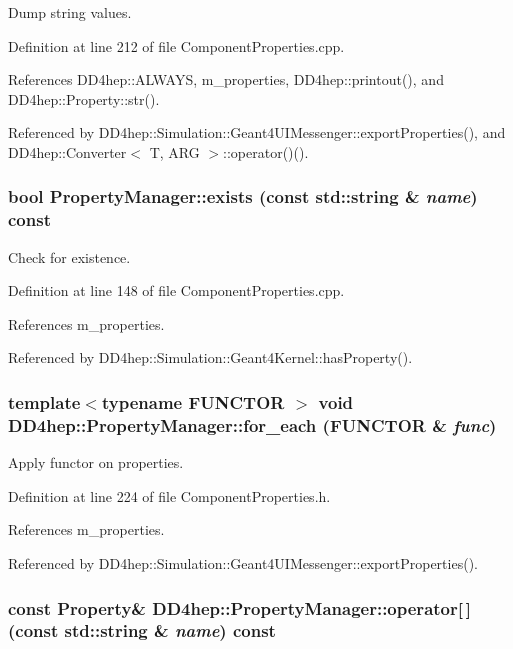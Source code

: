 Dump string values. 

Definition at line 212 of file ComponentProperties.cpp.

References DD4hep::ALWAYS, m\_\-properties, DD4hep::printout(), and DD4hep::Property::str().

Referenced by DD4hep::Simulation::Geant4UIMessenger::exportProperties(), and DD4hep::Converter$<$ T, ARG $>$::operator()().\hypertarget{class_d_d4hep_1_1_property_manager_a148a4782a23d9dcbede328256a0e9a04}{
\subsubsection[{exists}]{\setlength{\rightskip}{0pt plus 5cm}bool PropertyManager::exists (const std::string \& {\em name}) const}}
\label{class_d_d4hep_1_1_property_manager_a148a4782a23d9dcbede328256a0e9a04}


Check for existence. 

Definition at line 148 of file ComponentProperties.cpp.

References m\_\-properties.

Referenced by DD4hep::Simulation::Geant4Kernel::hasProperty().\hypertarget{class_d_d4hep_1_1_property_manager_a2a3c9803372155eca0b28efddb2fc5b7}{
\subsubsection[{for\_\-each}]{\setlength{\rightskip}{0pt plus 5cm}template$<$typename FUNCTOR $>$ void DD4hep::PropertyManager::for\_\-each (FUNCTOR \& {\em func})}}
\label{class_d_d4hep_1_1_property_manager_a2a3c9803372155eca0b28efddb2fc5b7}


Apply functor on properties. 

Definition at line 224 of file ComponentProperties.h.

References m\_\-properties.

Referenced by DD4hep::Simulation::Geant4UIMessenger::exportProperties().\hypertarget{class_d_d4hep_1_1_property_manager_adcb0b79db1b2b16883ad5758b5869824}{
\subsubsection[{operator[]}]{\setlength{\rightskip}{0pt plus 5cm}const {\bf Property}\& DD4hep::PropertyManager::operator\mbox{[}$\,$\mbox{]} (const std::string \& {\em name}) const}}
\label{class_d_d4hep_1_1_property_manager_adcb0b79db1b2b16883ad5758b5869824}


